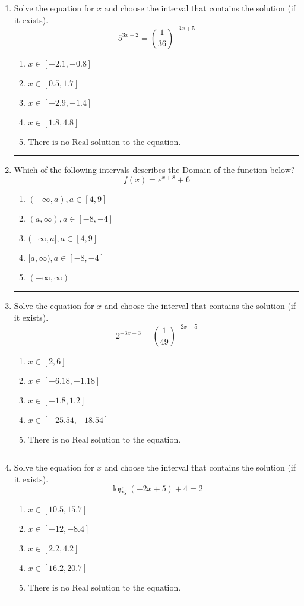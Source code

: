 \documentclass[14pt]{extbook}
\newcommand{\litem}[1]{\item#1\hspace*{-1cm}\rule{\textwidth}{0.4pt}}
\begin{document}
\begin{enumerate}
{\begin{enumerate}[label=\Alph*.]
\end{enumerate} }
\litem{
Solve the equation for $x$ and choose the interval that contains the solution (if it exists).\[ 5^{3x-2} = \left(\frac{1}{36}\right)^{-3x+5} \]\begin{enumerate}[label=\Alph*.]
\item \( x \in [-2.1, -0.8] \)
\item \( x \in [0.5, 1.7] \)
\item \( x \in [-2.9, -1.4] \)
\item \( x \in [1.8, 4.8] \)
\item \( \text{There is no Real solution to the equation.} \)

\end{enumerate} }
\litem{
Which of the following intervals describes the Domain of the function below?\[ f(x) = e^{x+8}+6 \]\begin{enumerate}[label=\Alph*.]
\item \( (-\infty, a), a \in [4, 9] \)
\item \( (a, \infty), a \in [-8, -4] \)
\item \( (-\infty, a], a \in [4, 9] \)
\item \( [a, \infty), a \in [-8, -4] \)
\item \( (-\infty, \infty) \)

\end{enumerate} }
\litem{
Solve the equation for $x$ and choose the interval that contains the solution (if it exists).\[ 2^{-3x-3} = \left(\frac{1}{49}\right)^{-2x-5} \]\begin{enumerate}[label=\Alph*.]
\item \( x \in [2, 6] \)
\item \( x \in [-6.18, -1.18] \)
\item \( x \in [-1.8, 1.2] \)
\item \( x \in [-25.54, -18.54] \)
\item \( \text{There is no Real solution to the equation.} \)

\end{enumerate} }
\litem{
Solve the equation for $x$ and choose the interval that contains the solution (if it exists).\[ \log_{5}{(-2x+5)}+4 = 2 \]\begin{enumerate}[label=\Alph*.]
\item \( x \in [10.5, 15.7] \)
\item \( x \in [-12, -8.4] \)
\item \( x \in [2.2, 4.2] \)
\item \( x \in [16.2, 20.7] \)
\item \( \text{There is no Real solution to the equation.} \)


\end{enumerate}}
\end{enumerate}
\end{document}
